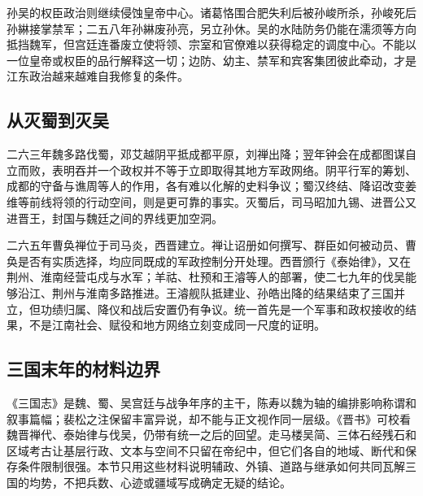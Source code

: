 孙吴的权臣政治则继续侵蚀皇帝中心。诸葛恪围合肥失利后被孙峻所杀，孙峻死后孙綝接掌禁军；二五八年孙綝废孙亮，另立孙休。吴的水陆防务仍能在濡须等方向抵挡魏军，但宫廷连番废立使将领、宗室和官僚难以获得稳定的调度中心。不能以一位皇帝或权臣的品行解释这一切；边防、幼主、禁军和宾客集团彼此牵动，才是江东政治越来越难自我修复的条件。

\subsection{从灭蜀到灭吴}

二六三年魏多路伐蜀，邓艾越阴平抵成都平原，刘禅出降；翌年钟会在成都图谋自立而败，表明吞并一个政权并不等于立即取得其地方军政网络。阴平行军的筹划、成都的守备与谯周等人的作用，各有难以化解的史料争议；蜀汉终结、降诏改变姜维等前线将领的行动空间，则是更可靠的事实。灭蜀后，司马昭加九锡、进晋公又进晋王，封国与魏廷之间的界线更加空洞。

二六五年曹奂禅位于司马炎，西晋建立。禅让诏册如何撰写、群臣如何被动员、曹奂是否有实质选择，均应同既成的军政控制分开处理。西晋颁行《泰始律》，又在荆州、淮南经营屯戍与水军；羊祜、杜预和王濬等人的部署，使二七九年的伐吴能够沿江、荆州与淮南多路推进。王濬舰队抵建业、孙皓出降的结果结束了三国并立，但功绩归属、降仪和战后安置仍有争议。统一首先是一个军事和政权接收的结果，不是江南社会、赋役和地方网络立刻变成同一尺度的证明。

\subsection{三国末年的材料边界}

《三国志》是魏、蜀、吴宫廷与战争年序的主干，陈寿以魏为轴的编排影响称谓和叙事篇幅；裴松之注保留丰富异说，却不能与正文视作同一层级。《晋书》可校看魏晋禅代、泰始律与伐吴，仍带有统一之后的回望。走马楼吴简、三体石经残石和区域考古让基层行政、文本与空间不只留在帝纪中，但它们各自的地域、断代和保存条件限制很强。本节只用这些材料说明辅政、外镇、道路与继承如何共同瓦解三国的均势，不把兵数、心迹或疆域写成确定无疑的结论。
